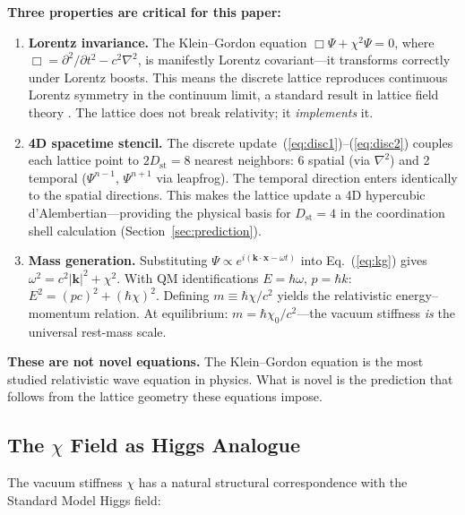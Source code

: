 \documentclass[12pt,a4paper]{article}
\newcommand{\chizero}{\chi_0}
\newcommand{\Dst}{D_{\mathrm{st}}}
\begin{document}
\textbf{Three properties are critical for this paper:}

\begin{enumerate}
\item \textbf{Lorentz invariance.} The Klein--Gordon equation $\Box\Psi + \chi^2\Psi = 0$, where $\Box = \partial^2/\partial t^2 - c^2\nabla^2$, is manifestly Lorentz covariant---it transforms correctly under Lorentz boosts. This means the discrete lattice reproduces continuous Lorentz symmetry in the continuum limit, a standard result in lattice field theory \citep{Wilson1974}. The lattice does not break relativity; it \textit{implements} it.

\item \textbf{4D spacetime stencil.} The discrete update~(\ref{eq:disc1})--(\ref{eq:disc2}) couples each lattice point to $2\Dst = 8$ nearest neighbors: 6 spatial (via $\nabla^2$) and 2 temporal ($\Psi^{n-1}$, $\Psi^{n+1}$ via leapfrog). The temporal direction enters identically to the spatial directions. This makes the lattice update a 4D hypercubic d'Alembertian---providing the physical basis for $\Dst = 4$ in the coordination shell calculation (Section~\ref{sec:prediction}).

\item \textbf{Mass generation.} Substituting $\Psi \propto e^{i(\mathbf{k}\cdot\mathbf{x} - \omega t)}$ into Eq.~(\ref{eq:kg}) gives $\omega^2 = c^2|\mathbf{k}|^2 + \chi^2$. With QM identifications $E = \hbar\omega$, $p = \hbar k$: $E^2 = (pc)^2 + (\hbar\chi)^2$. Defining $m \equiv \hbar\chi/c^2$ yields the relativistic energy--momentum relation. At equilibrium: $m = \hbar\chizero/c^2$---the vacuum stiffness \textit{is} the universal rest-mass scale.
\end{enumerate}

\textbf{These are not novel equations.} The Klein--Gordon equation is the most studied relativistic wave equation in physics. What is novel is the prediction that follows from the lattice geometry these equations impose.


\subsection{The \texorpdfstring{$\chi$}{chi} Field as Higgs Analogue}

The vacuum stiffness $\chi$ has a natural structural correspondence with the Standard Model Higgs field:
\end{document}
